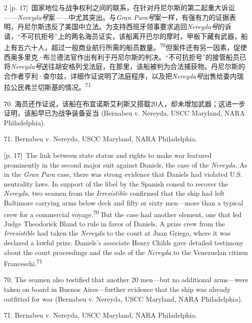 \documentclass[10pt,a4paper]{article}
\begin{document}
\begin{paracol}{2}
{\scriptsize\color{gray} [p. 17]}\ 国家地位与战争权利之间的联系，在针对丹尼尔斯的第二起重大诉讼——\textit{Nereyda号}案——中尤其突出。与\textit{Gran Para号}案一样，有强有力的证据表明，丹尼尔斯违反了美国中立法。为支持西班牙领事要求追回\textit{Nereyda号}的诉请，“不可抗拒号”上的两名海员证实，该船离开巴尔的摩时，甲板下藏有武器，船上有五六十人，超过一般商业航行所需的船员数\mbox{量。\textsuperscript{70}}但案件还有另一因素，促使西奥多里克·布兰德法官作出有利于丹尼尔斯的判决。“不可抗拒号”的接管船员已将\textit{Nereyda号}送往胡安格列戈法庭，在那里，该船被判为合法捕获物。丹尼尔斯的合作者亨利·查尔兹，详细作证说明了法庭程序，以及把\textit{Nereyda号}出售给委内瑞拉公民弗兰切斯基的情\mbox{况。\textsuperscript{71}}\par{\small 70. 海员还作证说，该船在布宜诺斯艾利斯又搭载20人，却未增加武器；这进一步证明，该船早已为战争装备妥当 (Bernabeu v. Nereyda, USCC Maryland, NARA Philadelphia).\par}{\small 71. Bernabeu v. Nereyda, USCC Maryland, NARA Philadelphia.\par}
\switchcolumn
{\scriptsize\color{gray} [p. 17]}\ The link between state status and rights to make war featured prominently in the second major suit against Daniels, the case of the \textit{Nereyda.} As in the \textit{Gran Para} case, there was strong evidence that Daniels had violated U.S. neutrality laws. In support of the libel by the Spanish consul to recover the \textit{Nereyda}, two seamen from the \textit{Irresistible} confirmed that the ship had left Baltimore carrying arms below deck and fifty or sixty men—more than a typical crew for a commercial voyage.\nobreak\textsuperscript{70} But the case had another element, one that led Judge Theodorick Bland to rule in favor of Daniels. A prize crew from the \textit{Irresistible} had taken the \textit{Nereyda} to the court at Juan Griego, where it was declared a lawful prize. Daniels’s associate Henry Childs gave detailed testimony about the court proceedings and the sale of the \textit{Nereyda} to the Venezuelan citizen Franceschi.\nobreak\textsuperscript{71}\par{\small 70. The seamen also testified that another 20 men—but no additional arms—were taken on board in Buenos Aires—further evidence that the ship was already outfitted for war (Bernabeu v. Nereyda, USCC Maryland, NARA Philadelphia).\par}{\small 71. Bernabeu v. Nereyda, USCC Maryland, NARA Philadelphia.\par}
\switchcolumn*

\end{paracol}
\end{document}
